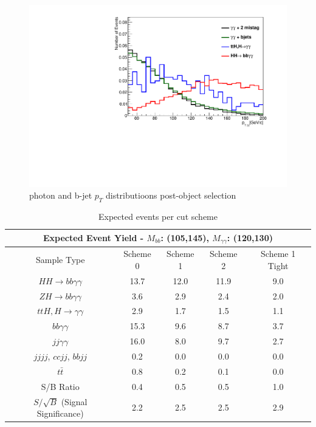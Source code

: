 \documentclass{cmspaper}
\begin{document}
\begin{figure}
\includegraphics[scale=0.35, angle=0]{figures/diphotonPt_ps_normalized.pdf}	
\caption{photon and b-jet $p_{T}$ distributioons post-object selection}
\label{fig:Ptcuts}
\end{figure}

\begin{table}[!ht]
\begin{center}
\begin{tabular}{|c|c|c|c|c|}   
\hline 
\multicolumn{5}{|c|}{\textbf{Expected Event Yield - $M_{bb}$: (105,145), $M_{\gamma\gamma}$: (120,130)}}\\ \hline
Sample Type                        & Scheme 0 & Scheme 1 & Scheme 2 & Scheme 1 Tight                 \\ \hline
$HH\rightarrow bb\gamma\gamma$     & 13.7     & 12.0     & 11.9     & 9.0                            \\ \hline
$ZH\rightarrow bb \gamma\gamma$    & 3.6      & 2.9      & 2.4      & 2.0                            \\ 
$ttH,H\rightarrow\gamma\gamma$     & 2.9      & 1.7      & 1.5      & 1.1                            \\ 
$bb\gamma\gamma$                   & 15.3     & 9.6      & 8.7      & 3.7                            \\ 
$jj\gamma\gamma$                   & 16.0     & 8.0      & 9.7      & 2.7                            \\ 
$jjjj$, $ccjj$, $bbjj$             & 0.2      & 0.0      & 0.0      & 0.0                            \\ 
$t\bar{t}$                         & 0.8      & 0.2      & 0.1      & 0.0                            \\ \hline
S/B Ratio                          & 0.4      & 0.5      & 0.5      & 1.0                            \\ \hline
$S/\sqrt{B}$ (Signal Significance) & 2.2      & 2.5      & 2.5      & 2.9                            \\ \hline
\end{tabular}
\caption{Expected events per cut scheme}
\label{tab:event_schemes}
\end{center}
\end{table}
\end{document}
